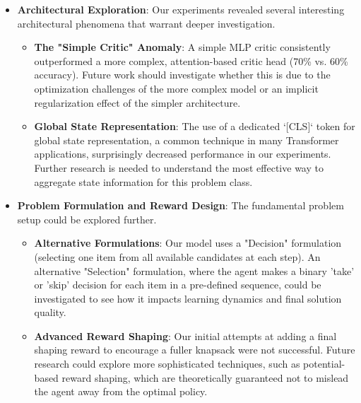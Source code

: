 \begin{itemize}
    \item \textbf{Architectural Exploration}:
    Our experiments revealed several interesting architectural phenomena that warrant deeper investigation.
        \begin{itemize}
            \item \textbf{The "Simple Critic" Anomaly}: A simple MLP critic consistently outperformed a more complex, attention-based critic head (70\% vs. 60\% accuracy). Future work should investigate whether this is due to the optimization challenges of the more complex model or an implicit regularization effect of the simpler architecture.
            \item \textbf{Global State Representation}: The use of a dedicated `[CLS]` token for global state representation, a common technique in many Transformer applications, surprisingly decreased performance in our experiments. Further research is needed to understand the most effective way to aggregate state information for this problem class.
        \end{itemize}

    \item \textbf{Problem Formulation and Reward Design}:
    The fundamental problem setup could be explored further.
        \begin{itemize}
            \item \textbf{Alternative Formulations}: Our model uses a "Decision" formulation (selecting one item from all available candidates at each step). An alternative "Selection" formulation, where the agent makes a binary 'take' or 'skip' decision for each item in a pre-defined sequence, could be investigated to see how it impacts learning dynamics and final solution quality.
            \item \textbf{Advanced Reward Shaping}: Our initial attempts at adding a final shaping reward to encourage a fuller knapsack were not successful. Future research could explore more sophisticated techniques, such as potential-based reward shaping, which are theoretically guaranteed not to mislead the agent away from the optimal policy.
        \end{itemize}


\end{itemize}
